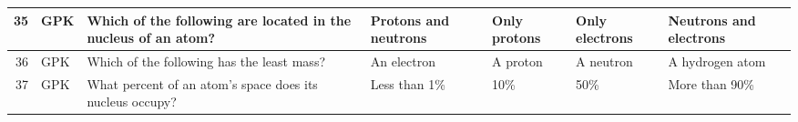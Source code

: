 \documentclass[10pt]{article}
\begin{document}
\begin{tiny}
\begin{longtable}{|r|p{0.375in}|p{1.275in}|p{0.75in}|p{0.75in}|p{0.75in}|p{0.75in}|}
    35    &      GPK &                                                                                                                                                                                                                    Which of the following are located in the nucleus of an atom? &                                                                                                                  Protons and neutrons &                                                                                          Only protons &                                                                                                             Only electrons &                                                                                                            Neutrons and electrons \\\hline
    36    &      GPK &                                                                                                                                                                                                                                       Which of the following has the least mass? &                                                                                                                           An electron &                                                                                              A proton &                                                                                                                  A neutron &                                                                                                                   A hydrogen atom \\\hline
    37    &      GPK &                                                                                                                                                                                                                         What percent of an atom's space does its nucleus occupy? &                                                                                                                          Less than 1\% &                                                                                                   10\% &                                                                                                                        50\% &                                                                                                                     More than 90\% \\\hline

\end{longtable}
\end{tiny}
\end{document}
